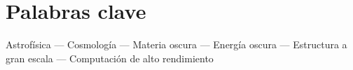 


\section{Palabras clave}

Astrof\'isica --- 
Cosmolog\'ia --- 
Materia oscura --- 
Energ\'ia oscura --- 
Estructura a gran escala --- 
Computaci\'on de alto rendimiento 
